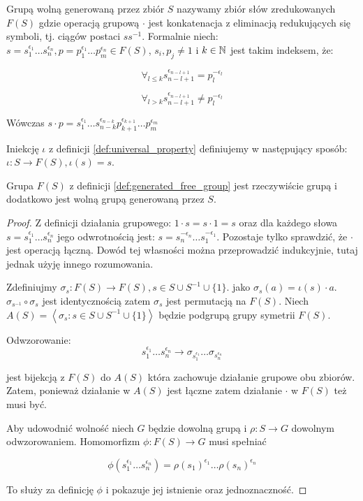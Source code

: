 \begin{defin}
  Grupą wolną generowaną przez zbiór $S$ nazywamy zbiór słów zredukowanych
  $F(S)$ gdzie operacją grupową $\cdot$ jest konkatenacja z eliminacją
  redukujących się symboli, tj. ciągów postaci $ss^{-1}$. Formalnie niech:
  $s = s_1^{\epsilon_1}\ldots s_n^{\epsilon_n}, p = p_1^{\epsilon_1}\ldots
  p_m^{\epsilon_n} \in F(S)$, $s_i, p_j \neq 1$ i $k \in \mathbb{N}$ jest takim
  indeksem, że:

  \[\forall_{l \leq k} s_{n - l + 1}^{\epsilon_{n - l + 1}} =
    p_l^{-\epsilon_l}\]

  \[\forall_{l > k} s_{n - l + 1}^{\epsilon_{n - l + 1}}
    \neq p_l^{-\epsilon_l}\]

  Wówczas $s \cdot p = s_1^{\epsilon_1}\ldots s_{n -
  k}^{\epsilon_{n-k}}p_{k+1}^{\epsilon_{k+1}}\ldots p_{m}^{\epsilon_m}$

  Iniekcję $\iota$ z definicji \ref{def:universal_property} definiujemy w
  następujący sposób: $\iota: S \rightarrow F(S), \iota(s) = s$.
  \label{def:generated_free_group}
\end{defin}

\begin{theorem}
  Grupa $F(S)$ z definicji \ref{def:generated_free_group} jest rzeczywiście grupą
  i dodatkowo jest wolną grupą generowaną przez $S$.
\end{theorem}
\begin{proof}
  Z definicji działania grupowego: $1 \cdot s = s \cdot 1 = s$ oraz
  dla każdego słowa
  $s = s_1^{\epsilon_1}\ldots s_n^{\epsilon_n}$
  jego odwrotnością jest:
  $s = s_n^{-\epsilon_n}\ldots s_1^{-\epsilon_1}$. Pozostaje tylko sprawdzić, że
  $\cdot$ jest operacją łączną. Dowód tej własności można przeprowadzić
  indukcyjnie, tutaj jednak użyję innego rozumowania.

  Zdefiniujmy $\sigma_s: F(S) \rightarrow F(S), s \in S \cup S^{-1} \cup \{1\}$.
  jako $\sigma_s(a) = \iota(s) \cdot a$. $\sigma_{s^{-1}} \circ \sigma_{s}$ jest
  identycznością zatem $\sigma_{s}$ jest permutacją na $F(S)$. Niech
  $A(S) = \left\langle \sigma_s : s \in S \cup S^{-1} \cup \{1\}\right\rangle$
  będzie podgrupą grupy symetrii $F(S)$.

  Odwzorowanie:
  \[
    s_1^{\epsilon_1} \ldots
    s_n^{\epsilon_n} \rightarrow
    \sigma_{s_1^{\epsilon_1}} \ldots
    \sigma_{s_n^{\epsilon_n}}
  \]

  jest bijekcją z $F(S)$ do $A(S)$ która zachowuje działanie grupowe obu zbiorów.
  Zatem, ponieważ działanie w $A(S)$ jest łączne zatem działanie $\cdot$ w
  $F(S)$ też musi być.

  Aby udowodnić wolność niech $G$ będzie dowolną grupą i $\rho: S \rightarrow G$
  dowolnym odwzorowaniem. Homomorfizm $\phi: F(S) \rightarrow G$ musi spełniać

  \[ \phi\left(s_1^{\epsilon_1} \ldots s_n^{\epsilon_n}\right) =
  \rho\left(s_1\right)^{\epsilon_1} \ldots \rho\left(s_n\right)^{\epsilon_n}\]

  To służy za definicję $\phi$ i pokazuje jej istnienie oraz jednoznaczność.
\end{proof}

